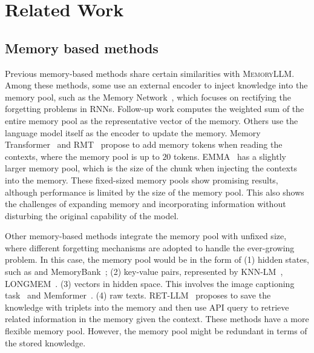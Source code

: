\documentclass{article}
\theoremstyle{plain}
\theoremstyle{definition}
\theoremstyle{remark}
\newcommand{\ours}{\textsc{MemoryLLM}\xspace}
\begin{document}


\section{Related Work}
\subsection{Memory based methods}
Previous memory-based methods share certain similarities with \ours. Among these methods, some use an external encoder to inject knowledge into the memory pool, such as the Memory Network~\citep{MemoryNetwork}, which focuses on rectifying the forgetting problems in RNNs. Follow-up work \citet{E2EMN} computes the weighted sum of the entire memory pool as the representative vector of the memory. Others use the language model itself as the encoder to update the memory. Memory Transformer~\citep{memoryTransformer} and RMT~\citep{RMT} propose to add memory tokens when reading the contexts, where the memory pool is up to $20$ tokens. EMMA~\citep{Memory-Enhanced-Transformer} has a slightly larger memory pool, which is the size of the chunk when injecting the contexts into the memory. These fixed-sized memory pools show promising results, although performance is limited by the size of the memory pool. This also shows the challenges of expanding memory and incorporating information without disturbing the original capability of the model. 

Other memory-based methods integrate the memory pool with unfixed size, where different forgetting mechanisms are adopted to handle the ever-growing problem. In this case, the memory pool would be in the form of (1) hidden states, such as \citep{GlobalMemoryTransformer} and MemoryBank~\citep{MemoryBank}; (2) key-value pairs, represented by KNN-LM~\citep{kNNLM}, LONGMEM~\citep{LongMEM}. (3) vectors in hidden space. This involves the image captioning task~\citep{MeshedTforIC} and Memformer~\citep{Memformer}. (4) raw texts. RET-LLM~\citep{ret-llm} proposes to save the knowledge with triplets into the memory and then use API query to retrieve related information in the memory given the context. 
These methods have a more flexible memory pool. However, the memory pool might be redundant in terms of the stored knowledge.
\end{document}
